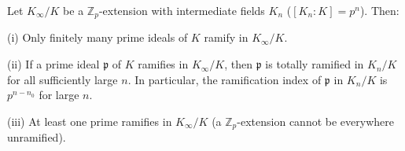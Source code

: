 Let $K_\infty / K$ be a $\mathbb{Z}_p$-extension with intermediate fields $K_n$ ($[K_n : K] = p^n$). Then:

(i) Only finitely many prime ideals of $K$ ramify in $K_\infty / K$.

(ii) If a prime ideal $\mathfrak{p}$ of $K$ ramifies in $K_\infty / K$, then $\mathfrak{p}$ is totally ramified in $K_n / K$ for all sufficiently large $n$. In particular, the ramification index of $\mathfrak{p}$ in $K_n / K$ is $p^{n - n_0}$ for large $n$.

(iii) At least one prime ramifies in $K_\infty / K$ (a $\mathbb{Z}_p$-extension cannot be everywhere unramified).
